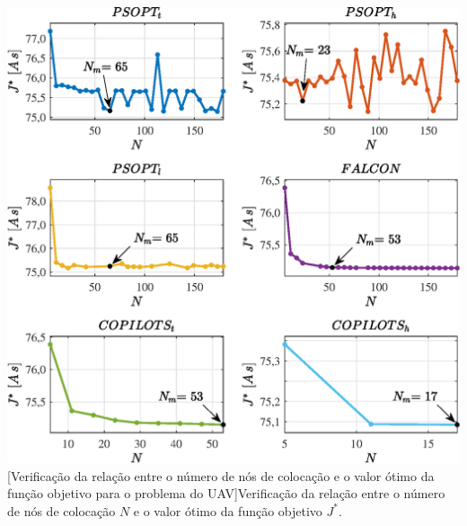 \noindent	
\begin{minipage}{\textwidth}
	\vspace{\onelineskip}
	\centering
	\includegraphics[scale=0.7]{fig/resultados/uav/sens/J}
	[Verificação da relação entre o número de nós de colocação e o valor ótimo da função objetivo para o problema do UAV]{Verificação da relação entre o número de nós de colocação $ N $ e o valor ótimo da função objetivo $ J^* $.}
	\label{fig:uav:sensibilidade:J}
	\vspace{\onelineskip}
\end{minipage}


